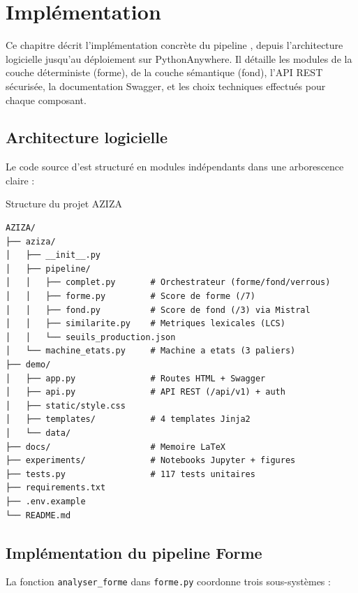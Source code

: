 \chapter{Implémentation}
\label{ch:impl}

Ce chapitre décrit l'implémentation concrète du pipeline \AZIZA, depuis l'architecture logicielle jusqu'au déploiement sur PythonAnywhere. Il détaille les modules de la couche déterministe (forme), de la couche sémantique (fond), l'API REST sécurisée, la documentation Swagger, et les choix techniques effectués pour chaque composant.

\section{Architecture logicielle}

Le code source d'\AZIZA est structuré en modules indépendants dans une arborescence claire :

\begin{treebox}{Structure du projet AZIZA}
{\footnotesize
\begin{verbatim}
AZIZA/
├── aziza/
│   ├── __init__.py
│   ├── pipeline/
│   │   ├── complet.py       # Orchestrateur (forme/fond/verrous)
│   │   ├── forme.py         # Score de forme (/7)
│   │   ├── fond.py          # Score de fond (/3) via Mistral
│   │   ├── similarite.py    # Metriques lexicales (LCS)
│   │   └── seuils_production.json
│   └── machine_etats.py     # Machine a etats (3 paliers)
├── demo/
│   ├── app.py               # Routes HTML + Swagger
│   ├── api.py               # API REST (/api/v1) + auth
│   ├── static/style.css
│   ├── templates/           # 4 templates Jinja2
│   └── data/
├── docs/                    # Memoire LaTeX
├── experiments/             # Notebooks Jupyter + figures
├── tests.py                 # 117 tests unitaires
├── requirements.txt
├── .env.example
└── README.md
\end{verbatim}
}
\end{treebox}

\section{Implémentation du pipeline Forme}

La fonction \texttt{analyser\_forme} dans \texttt{forme.py} coordonne trois sous-systèmes :

